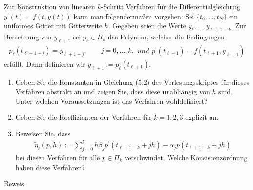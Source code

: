 \begin{exercise}
Zur Konstruktion von linearen $k$-Schritt Verfahren für die Differentialgleichung
$y^{\prime}(t) = f(t,y(t))$ kann man folgendermaßen vorgehen: Sei $\{t_0,\dots,t_N\}$
ein uniformes Gitter mit Gitterweite $h$. Gegeben seien die Werte $y_{\ell},\dots,y_{\ell + 1 - k}$.
Zur Berechnung von $y_{\ell + 1}$ sei $p_{\ell} \in \Pi_k$ das Polynom, welches
die Bedingungen
\begin{subequations}
\begin{align}
  p_{\ell}(t_{\ell + 1- j}) = y_{\ell + 1 - j}, \qquad j = 0,\dots,k,
\end{align}
und
\begin{align}
  p^{\prime}(t_{\ell + 1}) = f(t_{\ell + 1},y_{\ell + 1})
\end{align}
\end{subequations}
erfüllt. Dann definieren wir $y_{\ell + 1} := p_{\ell}(t_{\ell + 1})$.
\begin{enumerate}[label = \textbf{\alph*)}]
  \item Geben Sie die Konstanten in Gleichung (5.2) des Vorlesungsskriptes für
  dieses Verfahren abstrakt an und zeigen Sie, dass diese unabhängig von $h$ sind.
  Unter welchen Voraussetzungen ist das Verfahren wohldefiniert?
  \item Geben Sie die Koeffizienten der Verfahren für $k = 1,2,3$ explizit an.
  \item Beweisen Sie, dass
  \begin{align}
    \tilde{\eta}_{\ell}(p,h) := \sum_{j= 0}^kh\beta_jp^{\prime}(t_{\ell + 1 -k} + jh)
    - \alpha_jp(t_{\ell + 1 - k} + jh)
  \end{align}
  bei diesen Verfahren für alle $p \in \Pi_k$ verschwindet. Welche Konsistenzordnung
  haben diese Verfahren?
\end{enumerate}
\end{exercise}
\begin{solution}
Beweis.
\end{solution}
